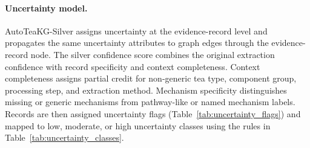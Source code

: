 \paragraph{Uncertainty model.}
AutoTeaKG-Silver assigns uncertainty at the evidence-record level and propagates the same uncertainty attributes to graph edges through the evidence-record node. The silver confidence score combines the original extraction confidence with record specificity and context completeness. Context completeness assigns partial credit for non-generic tea type, component group, processing step, and extraction method. Mechanism specificity distinguishes missing or generic mechanisms from pathway-like or named mechanism labels. Records are then assigned uncertainty flags (Table~\ref{tab:uncertainty_flags}) and mapped to low, moderate, or high uncertainty classes using the rules in Table~\ref{tab:uncertainty_classes}.

